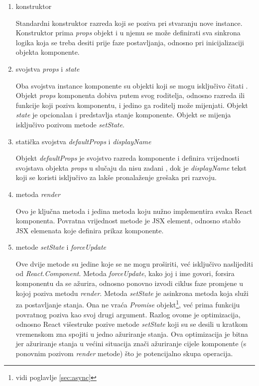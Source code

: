 \documentclass[times, utf8, diplomski, numeric]{fer}
\begin{document}
\begin{enumerate}[label=(\alph*)]

    \item konstruktor
    
    Standardni konstruktor razreda koji se poziva pri stvaranju nove instance. Konstruktor prima \emph{props} objekt i u njemu se može definirati sva sinkrona logika koja se treba desiti prije faze postavljanja, odnosno pri inicijalizaciji objekta komponente.

    \item svojstva \emph{props} i \emph{state}
    
    Oba svojstva instance komponente su objekti koji se mogu isključivo čitati .
    Objekt \emph{props} komponenta dobiva putem svog roditelja, odnosno razreda ili funkcije koji poziva komponentu, i jedino ga roditelj može mijenjati.
    Objekt \emph{state} je opcionalan i predstavlja stanje komponente. Objekt se mijenja isključivo pozivom metode \emph{setState}.

    \item statička svojstva \emph{defaultProps} i \emph{displayName}
    
    Objekt \emph{defaultProps} je svojstvo razreda komponente i definira vrijednosti svojstava objekta \emph{props} u slučaju da nisu zadani , dok je \emph{displayName} tekst koji se koristi isključivo za lakše pronalaženje grešaka pri razvoju.

    \item metoda \emph{render}
    
    Ovo je ključna metoda i jedina metoda koju nužno implementira svaka React komponenta. Povratna vrijednost metode je JSX element, odnosno stablo JSX elemenata koje definira prikaz komponente.

    \item metode \emph{setState} i \emph{forceUpdate}
    
    Ove dvije metode su jedine koje se ne mogu proširiti, već isključivo naslijediti od \emph{React.Component}.
    Metoda \emph{forceUpdate}, kako joj i ime govori, forsira komponentu da se ažurira, odnosno ponovno izvodi ciklus faze promjene u kojoj poziva metodu \emph{render}.
    Metoda \emph{setState} je asinkrona metoda koja služi za postavljanje stanja.
    Ona ne vraća \emph{Promise} objekt\footnote{vidi poglavlje \ref{sec:async}}, već prima funkciju povratnog poziva kao svoj drugi argument.
    Razlog ovome je optimizacija, odnosno React višestruke pozive metode \emph{setState} koji su se desili u kratkom vremenskom zna spojiti u jedno ažuriranje stanja.
    Ova optimizacija je bitna jer ažuriranje stanja u većini situacija znači ažuriranje cijele komponente (s ponovnim pozivom \emph{render} metode) što je potencijalno skupa operacija.


\end{enumerate}
\end{document}
